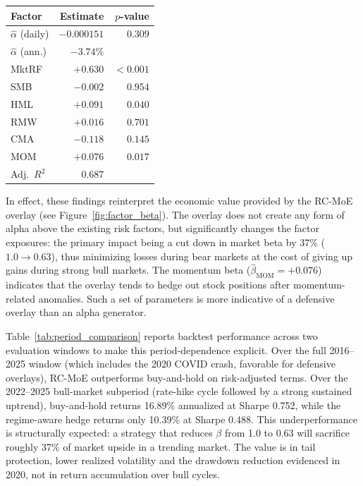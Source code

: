 \documentclass[]{interact}
\begin{document}
\begin{table}[H]
{\renewcommand{\arraystretch}{1.25}
\setlength{\tabcolsep}{8pt}
\begin{tabular}{lrr}
\toprule
\textbf{Factor} & \textbf{Estimate} & \textbf{$p$-value} \\
\midrule
$\hat{\alpha}$ (daily) & $-0.000151$ & $0.309$ \\
$\hat{\alpha}$ (ann.) & $-3.74\%$ & \\
\midrule
MktRF & $+0.630$ & $<0.001$ \\
SMB   & $-0.002$ & $0.954$  \\
HML   & $+0.091$ & $0.040$  \\
RMW   & $+0.016$ & $0.701$  \\
CMA   & $-0.118$ & $0.145$  \\
MOM   & $+0.076$ & $0.017$  \\
\midrule
Adj.\ $R^2$ & $0.687$ & \\
\bottomrule
\end{tabular}}
\label{tab:ff_alpha}
\end{table}

In effect, these findings reinterpret the economic value provided by the RC-MoE overlay (see Figure~\ref{fig:factor_beta}). The overlay does not create any form of alpha above the existing risk factors, but significantly changes the factor exposures: the primary impact being a cut down in market beta by 37\% ($1.0 \rightarrow 0.63$), thus minimizing losses during bear markets at the cost of giving up gains during strong bull markets. The momentum beta ($\hat{\beta}_{\text{MOM}} = +0.076$) indicates that the overlay tends to hedge out stock positions after momentum-related anomalies. Such a set of parameters is more indicative of a defensive overlay than an alpha generator.

Table~\ref{tab:period_comparison} reports backtest performance across two evaluation windows to make this period-dependence explicit. Over the full 2016--2025 window (which includes the 2020 COVID crash, favorable for defensive overlays), RC-MoE outperforms buy-and-hold on risk-adjusted terms. Over the 2022--2025 bull-market subperiod (rate-hike cycle followed by a strong sustained uptrend), buy-and-hold returns 16.89\% annualized at Sharpe 0.752, while the regime-aware hedge returns only 10.39\% at Sharpe 0.488. This underperformance is structurally expected: a strategy that reduces $\beta$ from 1.0 to 0.63 will sacrifice roughly 37\% of market upside in a trending market. The value is in tail protection, lower realized volatility and the drawdown reduction evidenced in 2020, not in return accumulation over bull cycles.
\end{document}

